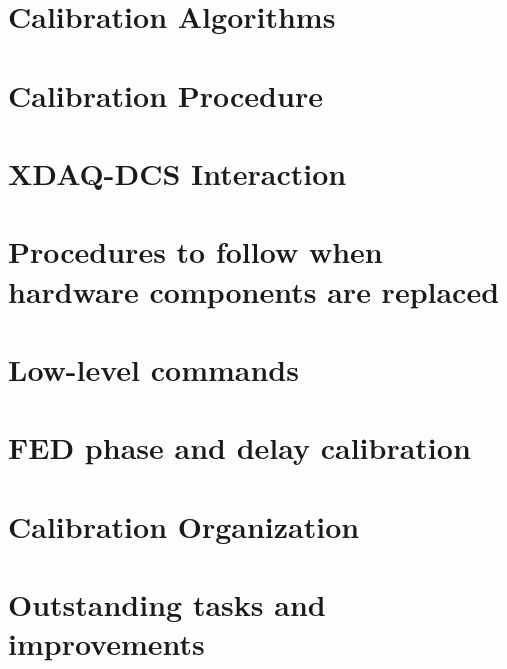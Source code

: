 \documentclass[12pt]{article}
\begin{document}
\section{Calibration Algorithms}
\label{sect:calib}


\section{Calibration Procedure}
\label{sec:calibproc}


\section{XDAQ-DCS Interaction}
\label{sec:dcs}


\section{Procedures to follow when hardware components are replaced}
\label{sec:hardware}


\section{Low-level commands}
\label{sec:lowlevel}


\clearpage

\appendix
\section{FED phase and delay calibration}
\label{App:phaseanddelay}



\section{Calibration Organization}
\label{App:caliborganize}


\section{Outstanding tasks and improvements}
\label{App:outstanding}


\clearpage



\end{document}
